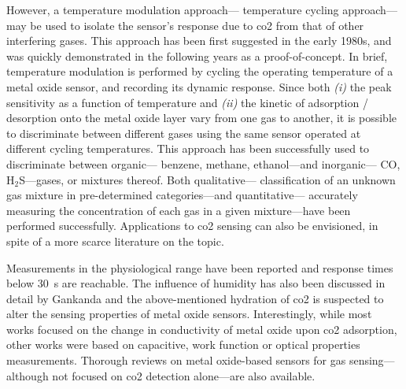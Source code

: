 However, a temperature modulation approach---\aka{} temperature cycling approach---may be used to isolate the sensor's response due to \gls{co2} from that of other interfering gases. This approach has been first suggested in the early 1980s\cite{heiland1981}, and was quickly demonstrated in the following years as a proof-of-concept\cite{sears1989, nakata1991, wlodek1991, hiranaka1992, nakata1996}. In brief, temperature modulation is performed by cycling the operating temperature of a metal oxide sensor, and recording its dynamic response. Since both \emph{(i)} the peak sensitivity as a function of temperature and \emph{(ii)} the kinetic of adsorption / desorption onto the metal oxide layer vary from one gas to another, it is possible to discriminate between different gases using the same sensor operated at different cycling temperatures\cite{lee1999}. This approach has been successfully used to discriminate between organic---\eg{} benzene, methane, ethanol\cite{hiranaka1992, nakata1996}---and inorganic---\eg{} CO, H$_2$S\cite{nakata1991}---gases, or mixtures thereof. Both qualitative---\ie{} classification of an unknown gas mixture in pre-determined categories\cite{vergara2009, gosangi2013}---and quantitative---\ie{} accurately measuring the concentration of each gas in a given mixture\cite{vergara2007, madrolle2018}---have been performed successfully. Applications to \gls{co2} sensing can also be envisioned, in spite of a more scarce literature on the topic\cite{choi2002, radhakrishnan2021}.

Measurements in the physiological range have been reported\cite{haeusler1996} and response times below 30~s are reachable\cite{ishihara1993, mizuno1993, colak2019}. The influence of humidity has also been discussed in detail by Gankanda \etal{}\cite{gankanda2016} and the above-mentioned hydration of \gls{co2} is suspected to alter the sensing properties of metal oxide sensors. Interestingly, while most works focused on the change in conductivity of metal oxide upon \gls{co2} adsorption, other works were based on capacitive\cite{ishihara1991b, ishihara1993, ishihara1995}, work function\cite{tanvir2015a, tanvir2015b} or optical properties\cite{alvarez2020} measurements. Thorough reviews on metal oxide-based sensors for gas sensing---although not focused on \gls{co2} detection alone---are also available\cite{korotcenkov2017, bhowmick2020}.


